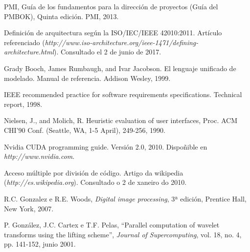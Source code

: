 

\begin{thebibliography}{99}
	
PMI, Guía de los fundamentos para la dirección de proyectos (Guía del PMBOK), Quinta edición. PMI, 2013. 	
	
 Definición de arquitectura según la ISO/IEC/IEEE 42010:2011. Artículo referenciado ({\it http://www.iso-architecture.org/ieee-1471/defining-architecture.html}). Consultado el 2 de junio de 2017.

Grady Booch, James Rumbaugh, and Ivar Jacobson. El lenguaje unificado de modelado. Manual
de referencia. Addison Wesley, 1999.

IEEE recommended practice for software requirements specifications. Technical report, 1998.

Nielsen, J., and Molich, R. Heuristic evaluation of user interfaces, Proc. ACM CHI'90 Conf. (Seattle, WA, 1-5 April), 249-256, 1990.

	
 Nvidia CUDA programming guide. Versión 2.0, 2010. Dispoñible en {\it http://www.nvidia.com}.

 Acceso múltiple por división de código. Artigo da wikipedia ({\it http://es.wikipedia.org}). Consultado o 2 de xaneiro do 2010.

 R.C. Gonzalez e R.E. Woods, {\it Digital image processing}, 3ª edición, Prentice Hall, New York, 2007.

 P. González, J.C. Cartex e T.F. Pelas, ``Parallel computation of wavelet transforms using the lifting scheme'', {\it Journal of Supercomputing}, vol. 18, no. 4, pp. 141-152, junio 2001.
\end{thebibliography}

